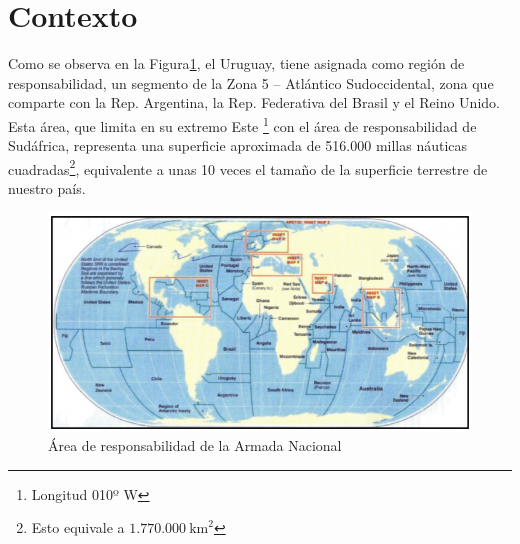 \section{Contexto}\label{sec:contexto}

Como se observa en la Figura\ref{fig:area_responsabilidad_armada}, el Uruguay, tiene asignada como región de responsabilidad, un segmento de la Zona 5 – Atlántico Sudoccidental, 
zona que comparte con la Rep. Argentina, la Rep. Federativa del Brasil y el Reino Unido. Esta área, que limita en su extremo Este \footnote{Longitud 010º W} con el área de responsabilidad de Sudáfrica, 
representa una superficie aproximada de 516.000 millas náuticas cuadradas\footnote{Esto equivale a \(1.770.000\ \text{km}^2\)}, equivalente a unas 10 veces el tamaño de la superficie terrestre de nuestro país.\\

\begin{figure}[!h]
    \centering
    \includegraphics[width=\textwidth]{../imagenes/secciones/2-descripcion-del-problema-y-solucion/Regiones De Responsabilidad SAR.png} %
    \caption{Área de responsabilidad de la Armada Nacional}
    \label{fig:area_responsabilidad_armada}
\end{figure}


\FloatBarrier
